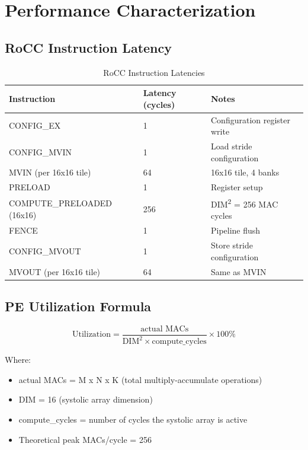 \documentclass[12pt,a4paper]{article}
\begin{document}
\section{Performance Characterization}

\subsection{RoCC Instruction Latency}

\begin{table}[H]
\centering
\begin{tabular}{|p{}|p{}|p{}|}
\hline
\textbf{Instruction} & \textbf{Latency (cycles)} & \textbf{Notes} \\
\hline
CONFIG\_EX & 1 & Configuration register write \\
\hline
CONFIG\_MVIN & 1 & Load stride configuration \\
\hline
MVIN (per 16x16 tile) & 64 & 16x16 tile, 4 banks \\
\hline
PRELOAD & 1 & Register setup \\
\hline
COMPUTE\_PRELOADED (16x16) & 256 & DIM\textsuperscript{2} = 256 MAC cycles \\
\hline
FENCE & 1 & Pipeline flush \\
\hline
CONFIG\_MVOUT & 1 & Store stride configuration \\
\hline
MVOUT (per 16x16 tile) & 64 & Same as MVIN \\
\hline
\end{tabular}
\caption{RoCC Instruction Latencies}
\end{table}

\subsection{PE Utilization Formula}

\begin{equation}
\text{Utilization} = \frac{\text{actual MACs}}{\text{DIM}^2 \times \text{compute\_cycles}} \times 100\%
\end{equation}

Where:
\begin{itemize}[leftmargin=*]
    \item actual MACs = M x N x K (total multiply-accumulate operations)
    \item DIM = 16 (systolic array dimension)
    \item compute\_cycles = number of cycles the systolic array is active
    \item Theoretical peak MACs/cycle = 256
\end{itemize}
\end{document}

